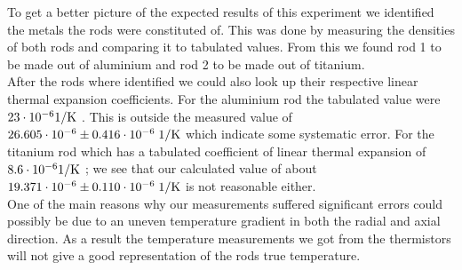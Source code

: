 




To get a better picture of the expected results of this experiment we identified the metals the rods were constituted of. This was done by measuring the densities of both rods and comparing it to tabulated values. From this we found rod 1 to be made out of aluminium and rod 2 to be made out of titanium.\\

After the rods where identified we could also look up their respective linear thermal expansion coefficients.
For the aluminium rod the tabulated value were $23\cdot10^{-6} \rm{1/K}$ \cite{coff}. This is outside the measured value of $26.605 \cdot 10^{-6} \pm 0.416 \cdot 10^{-6} \; \rm{1/K}$ which indicate some systematic error.
For the titanium rod which has a tabulated coefficient of linear thermal expansion of $8.6\cdot10^{-6} \rm{1/K}$ \cite{coff}; we see that our calculated value of about $19.371 \cdot 10^{-6} \pm 0.110 \cdot 10^{-6} \; \rm{1/K}$ is not reasonable either.\\

One of the main reasons why our measurements suffered significant errors could possibly be due to an uneven temperature gradient in both the radial and axial direction. As a result the temperature measurements we got from the thermistors will not give a good representation of the rods true temperature.
